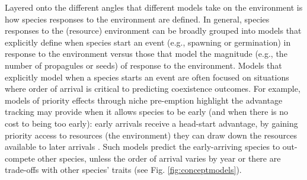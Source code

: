 \documentclass[11pt,letterpaper]{article}
\newcommand{\R}[1]{\label{#1}\linelabel{#1}}
\begin{document}

\R{whenhow2start}Layered onto the different angles that different models take on the environment is how species responses to the environment are defined. In general, species responses to the (resource) environment can be broadly grouped into models that explicitly define when species start an event (e.g., spawning or germination) in response to the environment versus those that model the magnitude (e.g., the number of propagules or seeds) of response to the environment. Models that explicitly model when a species starts an event are often focused on situations where order of arrival is critical to predicting coexistence outcomes. For example, models of priority effects through niche pre-emption highlight the advantage tracking may provide when it allows species to be early (and when there is no cost to being too early): early arrivals receive a head-start advantage, by gaining priority access to resources (the environment) they can draw down the resources available to later arrivals \citep{fukami2015}. Such models predict the early-arriving species to out-compete other species, unless the order of arrival varies by year or there are trade-offs with other species' traits (see Fig. \ref{fig:conceptmodels}).
\end{document}
